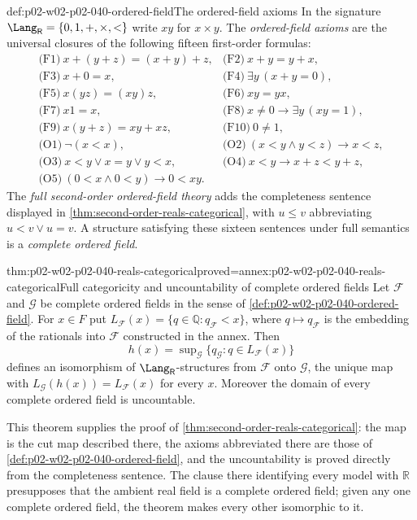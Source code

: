 \begin{hbdefinition}{def:p02-w02-p02-040-ordered-field}{The ordered-field axioms}
In the signature \(\Lang_{\mathsf R}=\{0,1,+,\times,<\}\) write \(xy\) for
\(x\times y\).  The \emph{ordered-field axioms} are the universal closures
of the following fifteen first-order formulas:
\[
\begin{array}{ll}
 \text{(F1)}\ x+(y+z)=(x+y)+z, & \text{(F2)}\ x+y=y+x,\\
 \text{(F3)}\ x+0=x, & \text{(F4)}\ \exists y\,(x+y=0),\\
 \text{(F5)}\ x(yz)=(xy)z, & \text{(F6)}\ xy=yx,\\
 \text{(F7)}\ x1=x, & \text{(F8)}\ x\neq0\to\exists y\,(xy=1),\\
 \text{(F9)}\ x(y+z)=xy+xz, & \text{(F10)}\ 0\neq1,\\
 \text{(O1)}\ \neg(x<x), & \text{(O2)}\ (x<y\land y<z)\to x<z,\\
 \text{(O3)}\ x<y\lor x=y\lor y<x, & \text{(O4)}\ x<y\to x+z<y+z,\\
 \text{(O5)}\ (0<x\land0<y)\to0<xy. &
\end{array}
\]
The \emph{full second-order ordered-field theory} adds the completeness
sentence displayed in \cref{thm:second-order-reals-categorical}, with
\(u\le v\) abbreviating \(u<v\lor u=v\).  A structure satisfying these
sixteen sentences under full semantics is a \emph{complete ordered field}.
\end{hbdefinition}

\begin{hbtheorem}{thm:p02-w02-p02-040-reals-categorical}{proved=annex:p02-w02-p02-040-reals-categorical}{Full categoricity and uncountability of complete ordered fields}
Let \(\mathcal F\) and \(\mathcal G\) be complete ordered fields in the
sense of \cref{def:p02-w02-p02-040-ordered-field}.  For \(x\in F\) put
\(L_{\mathcal F}(x)=\{q\in\mathbb Q:q_{\mathcal F}<x\}\), where
\(q\mapsto q_{\mathcal F}\) is the embedding of the rationals into
\(\mathcal F\) constructed in the annex.  Then
\[
 h(x)=\sup\nolimits_{\mathcal G}\{q_{\mathcal G}:q\in L_{\mathcal F}(x)\}
\]
defines an isomorphism of \(\Lang_{\mathsf R}\)-structures from
\(\mathcal F\) onto \(\mathcal G\), the unique map with
\(L_{\mathcal G}(h(x))=L_{\mathcal F}(x)\) for every \(x\).  Moreover the
domain of every complete ordered field is uncountable.
\end{hbtheorem}

This theorem supplies the proof of
\cref{thm:second-order-reals-categorical}: the map is the cut map described
there, the axioms abbreviated there are those of
\cref{def:p02-w02-p02-040-ordered-field}, and the uncountability is proved
directly from the completeness sentence.  The clause there identifying
every model with \(\mathbb R\) presupposes that the ambient real field is a
complete ordered field; given any one complete ordered field, the theorem
makes every other isomorphic to it.

